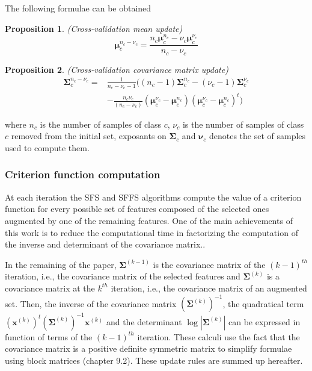 \documentclass[journal,peerreview,onecolumn]{IEEEtran}
\newtheorem{prop}{Proposition}
\begin{document}
        The following formulae can be obtained
        \begin{prop}
            \label{eq:update-cv1}
            (Cross-validation mean update)
            \begin{equation*}
                \boldsymbol{\mu}_c^{n_c-\nu_c} = \frac{n_c \boldsymbol{\mu}_c^{n_c} - \nu_c \boldsymbol{\mu}_c^{\nu_c}}{n_c - \nu_c} \nonumber
            \end{equation*}
        \end{prop}
        \begin{prop}
            \label{eq:update-cv2}
            (Cross-validation covariance matrix update)
            \begin{align*}
                \boldsymbol{\Sigma}_c^{n_c-\nu_c} = &\frac{1}{n_c-\nu_c-1} \biggl( (n_c-1) \boldsymbol{\Sigma}_c^{n_c} - (\nu_c-1) \boldsymbol{\Sigma}_c^{\nu_c} \nonumber \\
                &- \frac{n_c \nu_c}{(n_c-\nu_c)} (\boldsymbol{\mu}_c^{\nu_c}-\boldsymbol{\mu}_c^{n_c})(\boldsymbol{\mu}_c^{\nu_c}-\boldsymbol{\mu}_c^{n_c})^t \biggr) \nonumber
            \end{align*}
        \end{prop}
        where $n_c$ is the number of samples of class $c$, $\nu_c$ is the number of samples of class $c$ removed from the initial set, exposants on $\boldsymbol{\Sigma}_c$ and $\boldsymbol{\nu}_c$ denotes the set of samples used to compute them.

        \subsubsection{Criterion function computation}
        \label{sec:update-crit}

        At each iteration the SFS and SFFS algorithms compute the value of a criterion function for every possible set of features composed of the selected ones augmented by one of the remaining features. One of the main achievements of this work is to reduce the computational time in factorizing the computation of the inverse and determinant of the covariance matrix..

        In the remaining of the paper, $\boldsymbol{\Sigma}^{(k-1)}$ is the covariance matrix of the $(k-1)^{th}$ iteration, i.e., the covariance matrix of the selected features and $\boldsymbol{\Sigma}^{(k)}$ is a covariance matrix at the $k^{th}$ iteration, i.e., the covariance matrix of an augmented set. Then, the inverse of the covariance matrix $(\boldsymbol{\Sigma}^{(k)})^{-1}$, the quadratical term $(\mathbf{x}^{(k)})^t (\boldsymbol{\Sigma}^{(k)})^{-1} \mathbf{x}^{(k)}$ and the determinant $\log |\boldsymbol{\Sigma}^{(k)}|$ can be expressed in function of terms of the $(k-1)^{th}$ iteration. These calculi use the fact that the covariance matrix is a positive definite symmetric matrix to simplify formulae using block matrices \cite{webb2003statistical} (chapter 9.2). These update rules are summed up hereafter.
\end{document}
